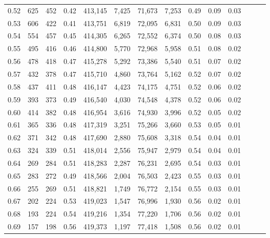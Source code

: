\begin{tabular}{rrrrrrrrrrrrrr}
0.52 &     625 &    452 &  0.42 &  413,145 &    7,425 &  71,673 &   7,253 &  0.49 &  0.09 &      0.03 \\
0.53 &     606 &    422 &  0.41 &  413,751 &    6,819 &  72,095 &   6,831 &  0.50 &  0.09 &      0.03 \\
0.54 &     554 &    457 &  0.45 &  414,305 &    6,265 &  72,552 &   6,374 &  0.50 &  0.08 &      0.03 \\
0.55 &     495 &    416 &  0.46 &  414,800 &    5,770 &  72,968 &   5,958 &  0.51 &  0.08 &      0.02 \\
0.56 &     478 &    418 &  0.47 &  415,278 &    5,292 &  73,386 &   5,540 &  0.51 &  0.07 &      0.02 \\
0.57 &     432 &    378 &  0.47 &  415,710 &    4,860 &  73,764 &   5,162 &  0.52 &  0.07 &      0.02 \\
0.58 &     437 &    411 &  0.48 &  416,147 &    4,423 &  74,175 &   4,751 &  0.52 &  0.06 &      0.02 \\
0.59 &     393 &    373 &  0.49 &  416,540 &    4,030 &  74,548 &   4,378 &  0.52 &  0.06 &      0.02 \\
0.60 &     414 &    382 &  0.48 &  416,954 &    3,616 &  74,930 &   3,996 &  0.52 &  0.05 &      0.02 \\
0.61 &     365 &    336 &  0.48 &  417,319 &    3,251 &  75,266 &   3,660 &  0.53 &  0.05 &      0.01 \\
0.62 &     371 &    342 &  0.48 &  417,690 &    2,880 &  75,608 &   3,318 &  0.54 &  0.04 &      0.01 \\
0.63 &     324 &    339 &  0.51 &  418,014 &    2,556 &  75,947 &   2,979 &  0.54 &  0.04 &      0.01 \\
0.64 &     269 &    284 &  0.51 &  418,283 &    2,287 &  76,231 &   2,695 &  0.54 &  0.03 &      0.01 \\
0.65 &     283 &    272 &  0.49 &  418,566 &    2,004 &  76,503 &   2,423 &  0.55 &  0.03 &      0.01 \\
0.66 &     255 &    269 &  0.51 &  418,821 &    1,749 &  76,772 &   2,154 &  0.55 &  0.03 &      0.01 \\
0.67 &     202 &    224 &  0.53 &  419,023 &    1,547 &  76,996 &   1,930 &  0.56 &  0.02 &      0.01 \\
0.68 &     193 &    224 &  0.54 &  419,216 &    1,354 &  77,220 &   1,706 &  0.56 &  0.02 &      0.01 \\
0.69 &     157 &    198 &  0.56 &  419,373 &    1,197 &  77,418 &   1,508 &  0.56 &  0.02 &      0.01 \\

\end{tabular}
